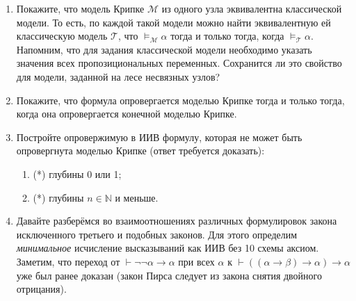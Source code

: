 \documentclass[10pt,a4paper,oneside]{article}
\begin{document}
\begin{enumerate}
\begin{enumerate}
\item Верно ли, что если формула опровергается некоторой конечной древовидной моделью Крипке (причём
у каждой вершины не больше двух сыновей), то эту 
древовидную модель можно достроить до полного бинарного дерева, с сохранением свойства опровержимости?

\item Верно ли, что если некоторая модель Крипке опровергает некоторую формулу,
то добавление любого мира к модели в качестве потомка к любому из узлов оставит опровержение в силе?
\end{enumerate}

\item Покажите, что модель Крипке $\mathcal{M}$ из одного узла эквивалентна классической модели.
То есть, по каждой такой модели можно найти эквивалентную ей классическую модель $\mathcal{T}$, 
что $\models_\mathcal{M}\alpha$ 
тогда и только тогда, когда $\models_\mathcal{T}\alpha$. Напомним, что для задания классической модели
необходимо указать значения всех пропозициональных переменных. Сохранится ли это свойство для модели,
заданной на лесе несвязных узлов?

\item Покажите, что формула опровергается моделью Крипке тогда и только тогда, когда она опровергается конечной моделью Крипке.

\item Постройте опровержимую в ИИВ формулу, которая не может быть опровергнута моделью Крипке (ответ требуется доказать):
\begin{enumerate}
\item (*) глубины 0 или 1;
\item (*) глубины $n \in \mathbb{N}$ и меньше.
\end{enumerate}


\item Давайте разберёмся во взаимоотношениях различных формулировок закона исключенного третьего и подобных
законов. Для этого определим \emph{минимальное} исчисление высказываний как ИИВ без 10 схемы аксиом.
Заметим, что переход от $\vdash\neg\neg\alpha\rightarrow\alpha$ при всех $\alpha$ к
$\vdash((\alpha\rightarrow\beta)\rightarrow\alpha)\rightarrow\alpha$ уже был ранее доказан 
(закон Пирса следует из закона снятия двойного отрицания).


\end{enumerate}
\end{document}
